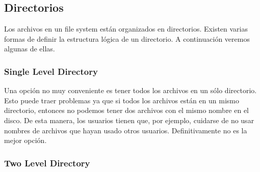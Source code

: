 \documentclass{article}
\begin{document}
% 

\subsection{Directorios}

Los archivos en un file system est\'an organizados en directorios. Existen varias formas de definir la estructura l\'ogica de un directorio. A continuaci\'on veremos algunas de ellas.

\subsubsection{Single Level Directory}

Una opci\'on no muy conveniente es tener todos los archivos en un s\'olo directorio. Esto puede traer problemas ya que si todos los archivos est\'an en un mismo directorio, entonces no podemos tener dos archivos con el mismo nombre en el disco. De esta manera, los usuarios tienen que, por ejemplo, cuidarse de no usar nombres de archivos que hayan usado otros usuarios. Definitivamente no es la mejor opci\'on.

\subsubsection{Two Level Directory}
\end{document}
